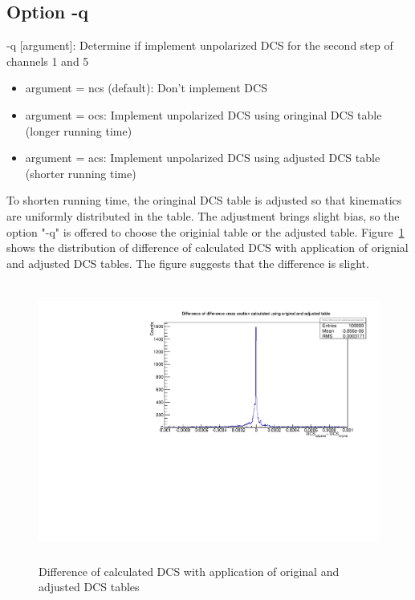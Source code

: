 \documentclass[a4paper]{article}
\begin{document}
\subsection{Option -q}
	-q [argument]: Determine if implement unpolarized DCS for the second step of channels 1 and 5
         \begin{itemize}
	 \item argument = ncs (default): Don't implement DCS
	 \item argument = ocs: Implement unpolarized DCS using oringinal DCS table (longer running time)
	 \item argument = acs: Implement unpolarized DCS using adjusted DCS table (shorter running time)
          \end{itemize}
To shorten running time, the oringinal DCS table is adjusted so that kinematics are uniformly distributed in the table. The adjustment brings slight bias, so the option "-q" is offered to choose the originial table or the adjusted table. Figure~\ref{diff} shows the distribution of difference of calculated DCS with application of orignial and adjusted DCS tables. The figure suggests that the difference is slight.

\begin{figure}[H]
   \begin{center}
   \includegraphics[width=6in,height=3.6in]{diff-ori-adj.pdf} 
   \caption[]{Difference of calculated DCS with application of original and adjusted DCS tables}      \label{diff}
   \end{center}
\end{figure}
\end{document}
